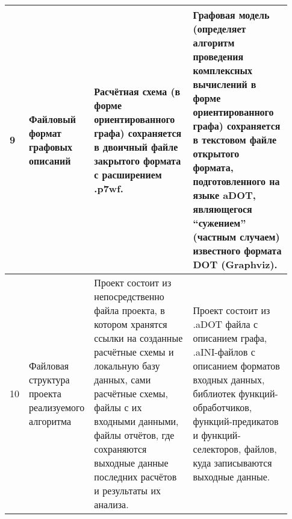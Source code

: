 \begin{landscape}
\begin{longtable}{|p{0.03\linewidth}|p{0.2\linewidth}|p{0.35\linewidth}|p{0.35\linewidth}|}
        9          & Файловый формат графовых описаний                                                          & Расчётная схема (в форме ориентированного графа) сохраняется в двоичный файле закрытого формата с расширением \textsf{.p7wf}.                                                                                                                                                                                                                                                                                                                                                                                                                                                                                                                                      & Графовая модель (определяет алгоритм проведения комплексных вычислений в форме ориентированного графа) сохраняется в текстовом файле открытого формата, подготовленного на языке \gls{aDOT}\cite{SokolovADOT2020}, являющегося ``сужением'' (частным случаем) известного формата DOT (Graphviz). \\
        \hline
        10         & Файловая структура проекта реализуемого алгоритма                                          & Проект состоит из непосредственно файла проекта, в котором хранятся ссылки на созданные расчётные схемы и локальную базу данных, сами расчётные схемы, файлы с их входными данными, файлы отчётов, где сохраняются выходные данные последних расчётов и результаты их анализа.                                                                                                                                                                                                                                                                                                                                                                                     & Проект состоит из \textsf{.aDOT} файла с описанием графа, \textsf{.aINI}-файлов с описанием форматов входных данных, библиотек функций-обработчиков, функций-предикатов и функций-селекторов, файлов, куда записываются выходные данные.                                                         \\
        \hline

\end{longtable}
\end{landscape}
